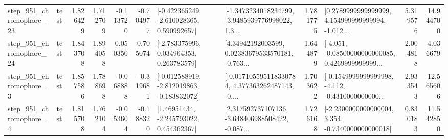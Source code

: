 \begin{tabular}{llrrrrllrlrr}
  step\_951\_chromophore\_23 &      test &      1.826429 &    1.712709 &     -0.113720 & -0.704977 &   [-0.422365249, -2.610028365, 0.590992657] &  [-1.3473234018234799, -3.9485939776998022, 1.3... &       1.781775 &  [0.2789999999999999, 4.154999999999994, -1.012... &            5.319576 &         14.944700 \\
  step\_951\_chromophore\_24 &      test &      1.843708 &    1.894058 &      0.050350 &  0.705074 &    [-2.783375996, 0.034964353, 0.263783579] &  [4.34942192003599, 0.02383679533570181, -0.763... &       1.644879 &  [-4.051, -0.08500000000000085, 0.4269999999999... &            2.004818 &          4.036679 \\
   step\_951\_chromophore\_3 &      test &      1.857586 &    1.788698 &     -0.068888 & -0.319681 &  [-0.012588919, -2.812019863, -0.183832072] &  [-0.017105595118330784, 4.377363262487143, -0.... &       1.703622 &  [-0.1549999999999998, -4.112, -0.4310000000000... &            2.933543 &         12.565606 \\
   step\_951\_chromophore\_4 &      test &      1.815708 &    1.762104 &     -0.053604 & -0.188320 &     [1.46951434, -2.245793022, 0.454362367] &  [2.317592737107136, -3.648406988508422, -0.087... &       1.726168 &  [-2.2300000000000004, 3.354, -0.7340000000000018] &            0.830183 &         11.542850 \\
\bottomrule
\end{tabular}

